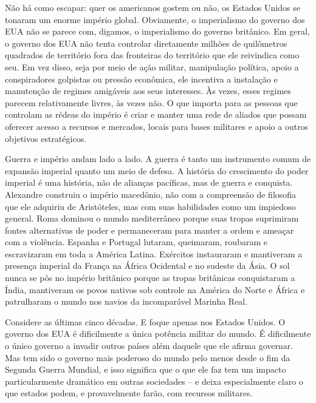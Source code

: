 Não há como escapar: quer os americanos gostem ou não, os Estados Unidos se tonaram um enorme império global. Obviamente, o imperialismo do governo dos EUA não se parece com, digamos, o imperialismo do governo britânico. Em geral, o governo dos EUA não tenta controlar diretamente milhões de quilômetros quadrados de território fora das fronteiras do território que ele reivindica como seu. Em vez disso, seja por meio de ação militar, manipulação política, apoio a conspiradores golpistas ou pressão econômica, ele incentiva a instalação e manutenção de regimes amigáveis aos seus interesses. Às vezes, esses regimes parecem relativamente livres, às vezes não. O que importa para as pessoas que controlam as rédeas do império é criar e manter uma rede de aliados que possam oferecer acesso a recursos e mercados, locais para bases militares e apoio a outros objetivos estratégicos.

Guerra e império andam lado a lado. A guerra é tanto um instrumento comum de expansão imperial quanto um meio de defesa. A história do crescimento do poder imperial é uma história, não de alianças pacíficas, mas de guerra e conquista. Alexandre construiu o império macedônio, não com a compreensão de filosofia que ele adquiriu de Aristóteles, mas com suas habilidades como um impiedoso general. Roma dominou o mundo mediterrâneo porque suas tropas suprimiram fontes alternativas de poder e permaneceram para manter a ordem e ameaçar com a violência. Espanha e Portugal lutaram, queimaram, roubaram e escravizaram em toda a América Latina. Exércitos instauraram e mantiveram a presença imperial da França na África Ocidental e no sudeste da Ásia. O sol nunca se pôs no império britânico porque as tropas britânicas conquistaram a Índia, mantiveram os povos nativos sob controle na América do Norte e África e patrulharam o mundo nos navios da incomparável Marinha Real.

Considere as últimas cinco décadas. E foque apenas nos Estados Unidos. O governo dos EUA é dificilmente a única potência militar do mundo. É dificilmente o único governo a invadir outros países além daquele que ele afirma governar. Mas tem sido o governo mais poderoso do mundo pelo menos desde o fim da Segunda Guerra Mundial, e isso significa que o que ele faz tem um impacto particularmente dramático em outras sociedades -- e deixa especialmente claro o que estados podem, e provavelmente farão, com recursos militares.

